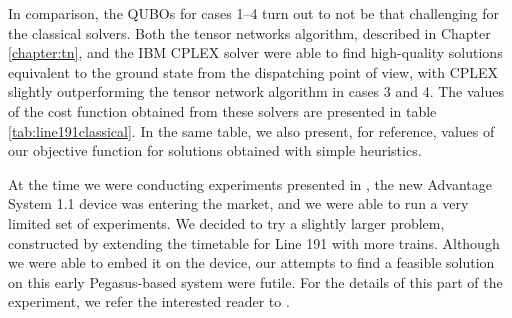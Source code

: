 In comparison, the QUBOs for cases 1--4 turn out to not be that challenging for
the classical solvers. Both the tensor networks algorithm, described in Chapter
\ref{chapter:tn}, and the IBM CPLEX solver were able to find high-quality
solutions equivalent to the ground state from the dispatching point of view,
with CPLEX slightly outperforming the tensor network algorithm in cases 3 and
4. The values of the cost function obtained from these solvers are presented in
table \ref{tab:line191classical}. In the same table, we also present, for
reference, values of our objective function for solutions obtained with simple
heuristics.

At the time we were conducting experiments presented in
\cite{railwaydispatching}, the new Advantage System 1.1 device was entering the
market, and we were able to run a very limited set of experiments. We decided
to try a slightly larger problem, constructed by extending the timetable for
Line 191 with more trains. Although we were able to embed it on the device, our
attempts to find a feasible solution on this early Pegasus-based system were
futile. For the details of this part of the experiment, we refer the interested
reader to \cite{railwaydispatching}.


